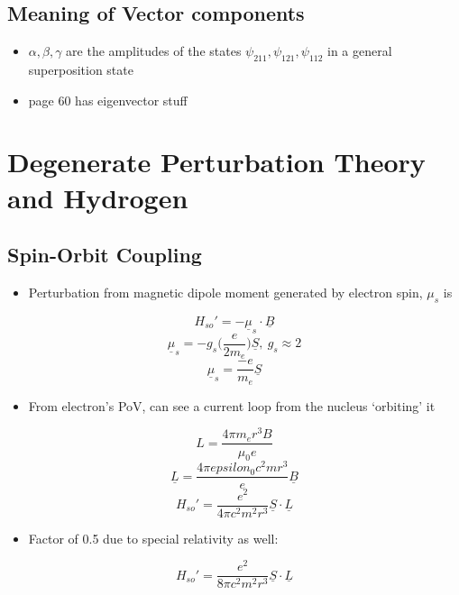 \documentclass[a4paper,11pt,normalem]{article}
\begin{document}
\subsection{Meaning of Vector components}\label{meaning-of-vector-components}

\begin{itemize}
\item
  \(\alpha, \beta, \gamma\) are the amplitudes of the states
  \(\psi_{211}, \psi_{121}, \psi_{112}\) in a general superposition
  state
\item
  page 60 has eigenvector stuff
\end{itemize}

\section{Degenerate Perturbation Theory and Hydrogen}\label{degenerate-perturbation-theory-and-hydrogen}

\subsection{Spin-Orbit Coupling}\label{spin-orbit-coupling}

\begin{itemize}
\item
  Perturbation from magnetic dipole moment generated by electron spin,
  \(\mu_s\) is
\end{itemize}

\[
    H_{so}' = -\underline{\mu}_s \cdot \underline{B} \] \[
    \underline{\mu}_s = -g_s \Big(\frac{e}{2m_e}\Big)\underline{S},~ g_s \approx 2 \]
\[
    \underline{\mu}_s = \frac{-e}{m_e}\underline{S}
\]

\begin{itemize}
\item
  From electron's PoV, can see a current loop from the nucleus
  `orbiting' it
\end{itemize}

\[
    L = \frac{4\pi m_er^3 B}{\mu_0 e} \] \[
    \underline{L} = \frac{4\pi epsilon_0 c^2 mr^3}{e}\underline{B} \] \[
    H_{so}' = \frac{e^2}{4\pi c^2 m^2 r^3}\underline{S}\cdot\underline{L}
\]

\begin{itemize}
\item
  Factor of 0.5 due to special relativity as well:
\end{itemize}

\[
    H_{so}' = \frac{e^2}{8\pi c^2 m^2 r^3}\underline{S}\cdot\underline{L}
\]
\end{document}
